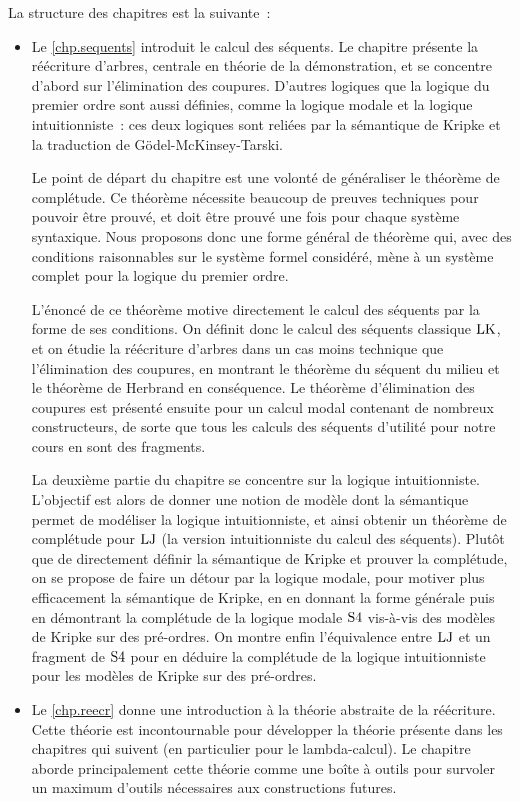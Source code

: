 La structure des chapitres est la suivante~:
\begin{itemize}
\item Le \cref{chp.sequents} introduit le calcul des séquents. Le chapitre
  présente la réécriture d'arbres, centrale en théorie de la démonstration, et
  se concentre d'abord sur l'élimination des coupures. D'autres logiques que
  la logique du premier ordre sont aussi définies, comme la logique modale et
  la logique intuitionniste~: ces deux logiques sont reliées par la sémantique
  de Kripke et la traduction de Gödel-McKinsey-Tarski.

  Le point de départ du chapitre est une volonté de généraliser le théorème de
  complétude. Ce théorème nécessite beaucoup de preuves techniques pour pouvoir
  être prouvé, et doit être prouvé une fois pour chaque système syntaxique. Nous
  proposons donc une forme général de théorème qui, avec des conditions
  raisonnables sur le système formel considéré, mène à un système complet pour
  la logique du premier ordre.

  L'énoncé de ce théorème motive directement le calcul des séquents par la
  forme de ses conditions. On définit donc le calcul des séquents classique
  $\operatorname{LK}$, et on étudie la réécriture d'arbres dans un cas moins technique que
  l'élimination des coupures, en montrant le théorème du séquent du milieu et
  le théorème de Herbrand en conséquence. Le théorème d'élimination des
  coupures est présenté ensuite pour un calcul modal contenant de nombreux
  constructeurs, de sorte que tous les calculs des séquents d'utilité pour notre
  cours en sont des fragments.

  La deuxième partie du chapitre se concentre sur la logique intuitionniste.
  L'objectif est alors de donner une notion de modèle dont la sémantique permet
  de modéliser la logique intuitionniste, et ainsi obtenir un théorème de
  complétude pour $\operatorname{LJ}$ (la version intuitionniste du calcul des séquents).
  Plutôt que de directement définir la sémantique de Kripke et prouver la
  complétude, on se propose de faire un détour par la logique modale, pour
  motiver plus efficacement la sémantique de Kripke, en en donnant la
  forme générale puis en démontrant la complétude de la logique modale $\mathrm{S}4$
  vis-à-vis des modèles de Kripke sur des pré-ordres. On montre enfin
  l'équivalence entre $\operatorname{LJ}$ et un fragment de $\mathrm{S}4$ pour en déduire la
  complétude de la logique intuitionniste pour les modèles de Kripke sur des
  pré-ordres.

\item Le \cref{chp.reecr} donne une introduction à la théorie abstraite de la
  réécriture. Cette théorie est incontournable pour développer la théorie
  présente dans les chapitres qui suivent (en particulier pour le
  lambda-calcul).
  Le chapitre aborde principalement cette théorie comme une boîte à outils pour
  survoler un maximum d'outils nécessaires aux constructions futures.


\end{itemize}
